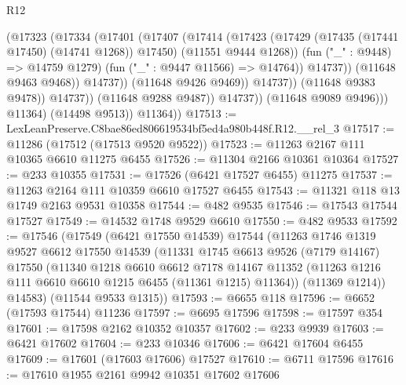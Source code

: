 \begin{lexlean}{R12}
\begin{coremodule}
                                    (@17323
                                      (@17334
                                        (@17401
                                          (@17407
                                            (@17414
                                              (@17423
                                                (@17429
                                                  (@17435 (@17441 @17450) (@14741 @1268))
                                                  @17450)
                                                (@11551 @9444 @1268))
                                              (fun ("_" : @9448) => @14759 @1279)
                                              (fun ("_" : @9447 @11566) => @14764))
                                            @14737))
                                        (@11648 @9463 @9468))
                                      @14737))
                                  (@11648 @9426 @9469))
                                @14737))
                            (@11648 @9383 @9478))
                          @14737))
                      (@11648 @9288 @9487))
                    @14737))
                (@11648 @9089 @9496)))
            @11364)
          (@14498 @9513))
        @11364))
@17513 := LexLeanPreserve.C8bae86ed806619534bf5ed4a980b448f.R12.__rel_3
@17517 := @11286 (@17512 (@17513 @9520 @9522))
@17523 := @11263 @2167 @111 @10365 @6610 @11275 @6455
@17526 := @11304 @2166 @10361 @10364
@17527 := @233 @10355
@17531 := @17526 (@6421 @17527 @6455) @11275
@17537 := @11263 @2164 @111 @10359 @6610 @17527 @6455
@17543 := @11321 @118 @13 @1749 @2163 @9531 @10358
@17544 := @482 @9535
@17546 := @17543 @17544 @17527
@17549 := @14532 @1748 @9529 @6610
@17550 := @482 @9533
@17592 := @17546
    (@17549
      (@6421 @17550 @14539)
      @17544
      (@11263
        @1746
        @1319
        @9527
        @6612
        @17550
        @14539
        (@11331
          @1745
          @6613
          @9526
          (@7179 @14167)
          @17550
          (@11340
            @1218
            @6610
            @6612
            @7178
            @14167
            @11352
            (@11263 @1216 @111 @6610 @6610 @1215 @6455 (@11361 @1215) @11364))
          (@11369 @1214))
        @14583)
      (@11544 @9533 @1315))
@17593 := @6655 @118
@17596 := @6652 (@17593 @17544) @11236
@17597 := @6695 @17596
@17598 := @17597 @354
@17601 := @17598 @2162 @10352 @10357
@17602 := @233 @9939
@17603 := @6421 @17602
@17604 := @233 @10346
@17606 := @6421 @17604 @6455
@17609 := @17601 (@17603 @17606) @17527
@17610 := @6711 @17596
@17616 := @17610 @1955 @2161 @9942 @10351 @17602 @17606

\end{coremodule}
\end{lexlean}
